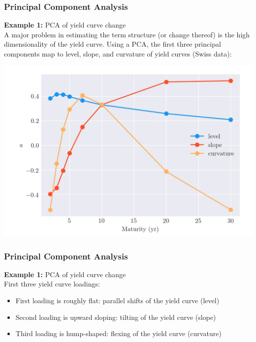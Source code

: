 \documentclass[xcolor=dvipsnames, english, 8pt]{beamer}
\begin{document}
\begin{frame}
    \frametitle{Principal Component Analysis}
\textbf{Example 1:} PCA of yield curve change\vspace{0.25cm}\\
    A major problem in estimating the term structure (or change thereof) is the high dimensionality of the yield curve. Using a PCA, the first three principal components map to {\color{Cerulean}level}, {\color{RedOrange}slope}, and {\color{Peach}curvature} of yield curves (Swiss data):
\begin{center}

    \includegraphics[scale=0.15]{tsPCA}
\end{center}
\end{frame}

\begin{frame}
    \frametitle{Principal Component Analysis}
\textbf{Example 1:} PCA of yield curve change\vspace{0.25cm}\\
First three yield curve loadings:
\begin{itemize}
    \item First loading is roughly flat: parallel shifts of the yield curve ({\color{ubRed}level})
    \item Second loading is upward sloping: tilting of the yield curve ({\color{ubRed}slope})
    \item Third loading is hump-shaped: flexing of the yield curve ({\color{ubRed}curvature})
\end{itemize}
\end{frame}
\end{document}
